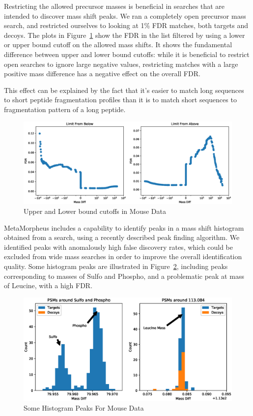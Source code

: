 \documentclass[journal=jprobs,manuscript=article]{achemso}
\begin{document}
Restricting the allowed precursor masses is beneficial in searches that are intended to discover mass shift peaks.
We ran a completely open precursor mass search, and restricted ourselves to looking at 1\% FDR matches, both targets and decoys.
The plots in Figure~\ref{fig:figure2-upperlowerbounds} show the FDR in the list filtered by using a lower or upper bound cutoff on the allowed mass shifts.
It shows the fundamental difference between upper and lower bound cutoffs: while it is beneficial to restrict open searches to ignore large negative values, restricting matches with a large positive mass difference has a negative effect on the overall FDR.

This effect can be explained by the fact that it's easier to match long sequences to short peptide fragmentation profiles than it is to match short sequences to fragmentation pattern of a long peptide.

\begin{figure}
\caption{Upper and Lower bound cutoffs in Mouse Data}
\label{fig:figure2-upperlowerbounds}
\includegraphics[scale=0.5]{figure_2-upperlowerbounds}
\end{figure}

MetaMorpheus includes a capability to identify peaks in a mass shift histogram obtained from a search, using a recently described peak finding algorithm\cite{Rodriguez_2014}.
We identified peaks with anomalously high false discovery rates, which could be excluded from wide mass searches in order to improve the overall identification quality.
Some histogram peaks are illustrated in Figure~\ref{fig:figure3}, including peaks corresponding to masses of Sulfo and Phospho, and a problematic peak at mass of Leucine, with a high FDR.

\begin{figure}
\caption{Some Histogram Peaks For Mouse Data}
\label{fig:figure3}
\includegraphics[scale=0.6]{figure_3peaks}
\end{figure}
\end{document}
